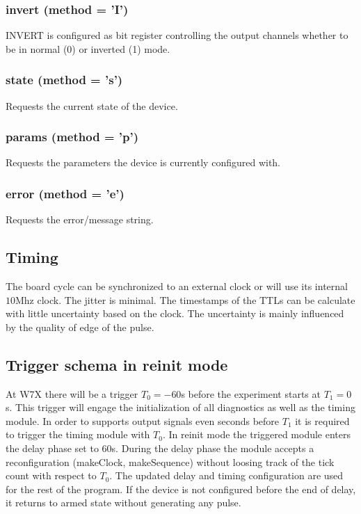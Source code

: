 \documentclass{article}
\begin{document}
\subsubsection*{invert (method = 'I')}
INVERT is configured as bit register controlling the output channels whether to be in normal (0) or inverted (1) mode.
\subsubsection*{state (method = 's')}
Requests the current state of the device.
\subsubsection*{params (method = 'p')}
Requests the parameters the device is  currently configured with.
\subsubsection*{error (method = 'e')}
Requests the error/message string. 

\subsection*{Timing}
The board cycle can be synchronized to an external clock or will use its internal $10$Mhz clock.
The jitter is minimal. The timestamps of the TTLs can be calculate with little uncertainty based on the clock. The uncertainty is mainly influenced by the quality of edge of the pulse.

\subsection*{Trigger schema in reinit mode}
At W7X there will be a trigger $T_0=-60$s before the experiment starts at $T_1=0$s. This trigger will engage the initialization of all diagnostics as well as the timing module. In order to supports output signals even seconds before $T_1$ it is required to trigger the timing module with $T_0$. In reinit mode the triggered module enters the delay phase set to $60$s. During the delay phase the module accepts a reconfiguration (makeClock, makeSequence) without loosing track of the tick count with respect to $T_0$. The updated delay and timing configuration are used for the rest of the program. If the device is not configured before the end of delay, it returns to armed state without generating any pulse.
\end{document}
